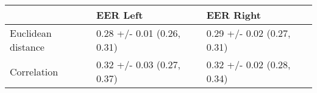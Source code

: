 \begin{tabular}{lll}
\toprule
{} &                    EER Left &                   EER Right \\
\midrule
Euclidean distance &  0.28 +/- 0.01 (0.26, 0.31) &  0.29 +/- 0.02 (0.27, 0.31) \\
Correlation        &  0.32 +/- 0.03 (0.27, 0.37) &  0.32 +/- 0.02 (0.28, 0.34) \\
\bottomrule
\end{tabular}
